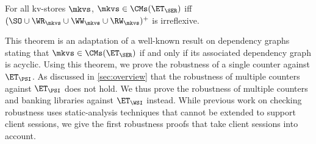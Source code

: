 \begin{theorem}
\label{thm:serialisable_nocycle}
For all kv-stores $\mkvs$, $\mkvs \in \CMs(\ET_{\SER})$ iff $(\SO \cup \WR_{\mkvs} 
\cup \WW_{\mkvs} \cup \RW_{\mkvs})^{+}$ is irreflexive.
\end{theorem}
This theorem is an adaptation of a well-known result on
dependency graphs~\cite{adya} stating that $\mkvs \in \CMs(\ET_{\SER})$ if and
only if its associated dependency graph is acyclic. 
Using this theorem, we prove the robustness of a single counter against $\ET_{\PSI}$.
As discussed in \cref{sec:overview} that the robustness of multiple counters against $\ET_{\PSI}$ does not hold.
We thus prove the robustness of multiple counters and banking libraries \citep{bank-example-wsi} against $\ET_{\WSI}$ instead. 
While previous work on checking robustness \citep{giovanni_concur16,SIanalysis,laws,sureshConcur} uses
static-analysis techniques that cannot be extended to support client sessions, 
we give the first robustness proofs that take client sessions into account.



